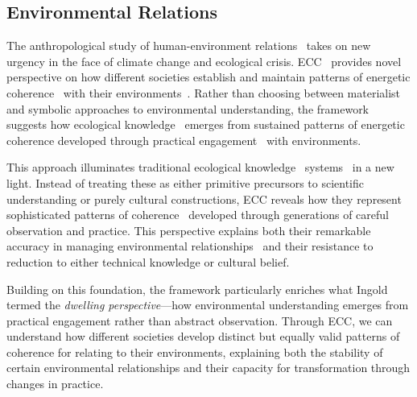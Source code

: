 \subsection*{Environmental Relations~}

The anthropological study of human-environment relations~ takes on new urgency in the face of climate change and ecological crisis. ECC~ provides novel perspective on how different societies establish and maintain patterns of energetic coherence~ with their environments~\cite{ingold2000perception,ingold2011being}. Rather than choosing between materialist and symbolic approaches to environmental understanding, the framework suggests how ecological knowledge~ emerges from sustained patterns of energetic coherence developed through practical engagement~ with environments.

This approach illuminates traditional ecological knowledge~ systems~\cite{berkes2012sacred,nadasdy2003hunters} in a new light. Instead of treating these as either primitive precursors to scientific understanding or purely cultural constructions, ECC reveals how they represent sophisticated patterns of coherence~ developed through generations of careful observation and practice. This perspective explains both their remarkable accuracy in managing environmental relationships~ and their resistance to reduction to either technical knowledge or cultural belief.

Building on this foundation, the framework particularly enriches what Ingold~\cite{ingold2000perception,ingold2013making} termed the \textit{dwelling perspective}—how environmental understanding emerges from practical engagement rather than abstract observation. Through ECC, we can understand how different societies develop distinct but equally valid patterns of coherence for relating to their environments, explaining both the stability of certain environmental relationships and their capacity for transformation through changes in practice.

